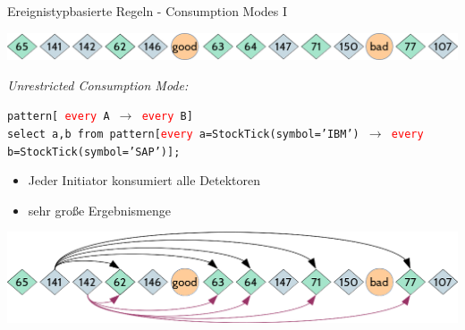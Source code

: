 \documentclass[usenames,dvipsnames]{beamer}
\begin{document}
\begin{frame}{Ereignistypbasierte Regeln - Consumption Modes I}
\begin{center}
    \includegraphics[scale=0.4]{img/stream-2}
\end{center}
\begin{exampleblock}{\textit{Unrestricted Consumption Mode:}}
    \begin{center}
        \texttt{pattern[ \textcolor{red}{every} A $\rightarrow$ \textcolor{red}{every} 
        B]}\\\vspace{0.3cm}
        \texttt{select a,b from pattern[\textcolor{red}{every} a=StockTick(symbol='IBM') 
        $\rightarrow$ 
            \textcolor{red}{every} b=StockTick(symbol='SAP')];}
        \end{center}
        \begin{itemize}
            \item Jeder Initiator konsumiert alle Detektoren
            \item sehr große Ergebnismenge
        \end{itemize}
    \end{exampleblock}

\begin{center}
\includegraphics[scale=0.3]{img/solution-c}
\end{center}
\end{frame}
\end{document}

